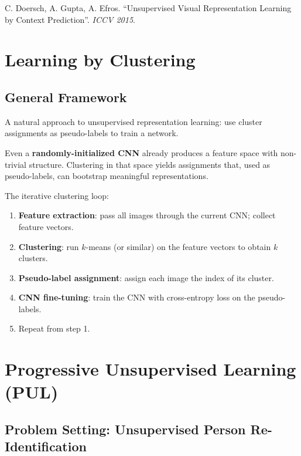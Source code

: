 \documentclass[11pt,a4paper]{article}
\theoremstyle{definition}
\theoremstyle{plain}
\theoremstyle{remark}
\begin{document}
\begin{tcolorbox}[colback=blue!5!white,colframe=blue!60!black,title={Reference}]
C. Doersch, A. Gupta, A. Efros. ``Unsupervised Visual Representation Learning by Context Prediction''. \textit{ICCV 2015}.
\end{tcolorbox}


\section{Learning by Clustering}

\subsection{General Framework}

A natural approach to unsupervised representation learning: use cluster assignments as pseudo-labels to train a network.

\begin{tcolorbox}[colback=green!5!white,colframe=green!60!black,title=\textbf{Key Observation}]
Even a \textbf{randomly-initialized CNN} already produces a feature space with non-trivial structure. Clustering in that space yields assignments that, used as pseudo-labels, can bootstrap meaningful representations.
\end{tcolorbox}

The iterative clustering loop:
\begin{enumerate}
    \item \textbf{Feature extraction}: pass all images through the current CNN; collect feature vectors.
    \item \textbf{Clustering}: run $k$-means (or similar) on the feature vectors to obtain $k$ clusters.
    \item \textbf{Pseudo-label assignment}: assign each image the index of its cluster.
    \item \textbf{CNN fine-tuning}: train the CNN with cross-entropy loss on the pseudo-labels.
    \item Repeat from step 1.
\end{enumerate}


\section{Progressive Unsupervised Learning (PUL)}

\subsection{Problem Setting: Unsupervised Person Re-Identification}
\end{document}
